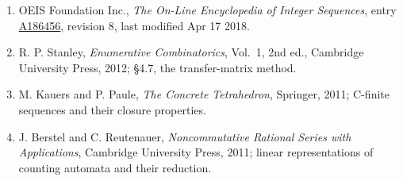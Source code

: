 \documentclass[11pt]{article}
\theoremstyle{definition}
\begin{document}
\begin{enumerate}

\item OEIS Foundation Inc., \emph{The On-Line Encyclopedia of Integer Sequences}, entry \href{https://oeis.org/A186456}{A186456}, revision 8, last modified Apr 17 2018.

\item R. P. Stanley, \emph{Enumerative Combinatorics}, Vol.~1, 2nd ed., Cambridge University Press, 2012; \S4.7, the transfer-matrix method.

\item M. Kauers and P. Paule, \emph{The Concrete Tetrahedron}, Springer, 2011; C-finite sequences and their closure properties.

\item J. Berstel and C. Reutenauer, \emph{Noncommutative Rational Series with Applications}, Cambridge University Press, 2011; linear representations of counting automata and their reduction.

\end{enumerate}
\end{document}
